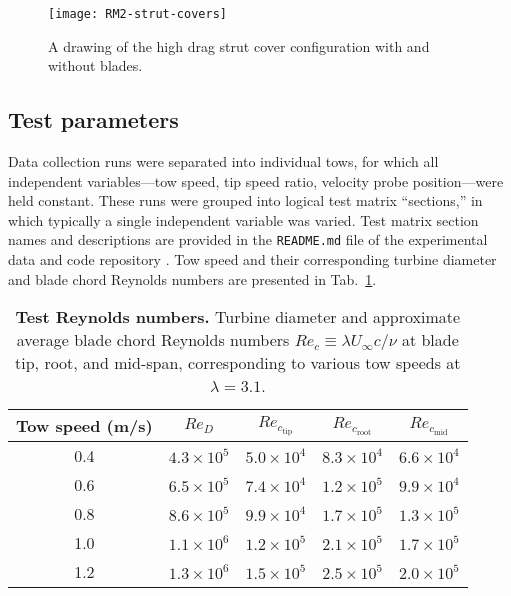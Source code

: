 \begin{figure}
    \texttt{[image: RM2-strut-covers]}
    
    \caption{A drawing of the high drag strut cover configuration with and
        without blades.}
    
    \label{fig:covers}
\end{figure}


\subsection{Test parameters}

Data collection runs were separated into individual tows, for which all
independent variables---tow speed, tip speed ratio, velocity probe
position---were held constant. These runs were grouped into logical test matrix
``sections,'' in which typically a single independent variable was varied. Test
matrix section names and descriptions are provided in the \texttt{README.md}
file of the experimental data and code repository \cite{Bachant2016-RM2-data}.
Tow speed and their corresponding turbine diameter and blade chord Reynolds
numbers are presented in Tab.~\ref{tab:re}.

\begin{table}
    \centering
    \begin{tabular}{c|c|c|c|c}
        Tow speed (m/s) & $Re_D$ & $Re_{c_\mathrm{tip}}$ & $Re_{c_\mathrm{root}}$ & $Re_{c_\mathrm{mid}}$\\
        \hline
        0.4 & $4.3 \times 10^5$ & $5.0 \times 10^4$ & $8.3 \times 10^4$ & $6.6 \times 10^4$ \\
        0.6 & $6.5 \times 10^5$ & $7.4 \times 10^4$ & $1.2 \times 10^5$ & $9.9 \times 10^4$ \\
        0.8 & $8.6 \times 10^5$ & $9.9 \times 10^4$ & $1.7 \times 10^5$ & $1.3 \times 10^5$ \\
        1.0 & $1.1 \times 10^6$ & $1.2 \times 10^5$ & $2.1 \times 10^5$ & $1.7 \times 10^5$ \\
        1.2 & $1.3 \times 10^6$ & $1.5 \times 10^5$ & $2.5 \times 10^5$ & $2.0 \times 10^5$ \\
    \end{tabular}
    
    \caption{{\bf Test Reynolds numbers.} Turbine diameter and approximate average
        blade chord Reynolds numbers $Re_c \equiv \lambda U_\infty c / \nu$ at blade
        tip, root, and mid-span, corresponding to various tow speeds at $\lambda=3.1$.}
    
    \label{tab:re}
\end{table}

